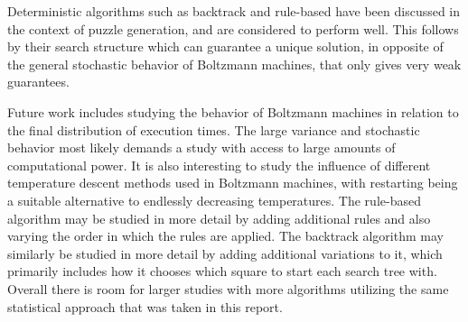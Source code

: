 \documentclass[a4paper,11pt]{kth-mag}
\begin{document}
Deterministic algorithms such as backtrack and rule-based have been discussed in the context of puzzle generation, and are considered to perform well.
This follows by their search structure which can guarantee a unique solution, in opposite of the general stochastic behavior of Boltzmann machines, that only gives very weak guarantees.

Future work includes studying the behavior of Boltzmann machines in relation to the final distribution of execution times.
The large variance and stochastic behavior most likely demands a study with access to large amounts of computational power.
It is also interesting to study the influence of different temperature descent methods used in Boltzmann machines, with restarting being a suitable alternative to endlessly decreasing temperatures.
The rule-based algorithm may be studied in more detail by adding additional rules and also varying the order in which the rules are applied.
The backtrack algorithm may similarly be studied in more detail by adding additional variations to it, which primarily includes how it chooses which square to start each search tree with.
Overall there is room for larger studies with more algorithms utilizing the same statistical approach that was taken in this report.
\end{document}
